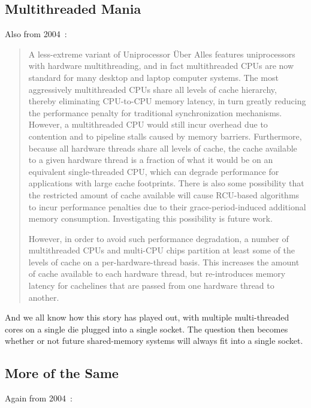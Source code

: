 \subsection{Multithreaded Mania}
\label{sec:future:Multithreaded Mania}

Also from 2004~\cite{PaulEdwardMcKenneyPhD}:

\begin{quote}
	A less-extreme variant of Uniprocessor \"Uber Alles features
	uniprocessors with hardware multithreading, and in fact
	multithreaded CPUs are now standard for many desktop and laptop
	computer systems.  The most aggressively multithreaded CPUs share
	all levels of cache hierarchy, thereby eliminating CPU-to-CPU
	memory latency, in turn greatly reducing the performance
	penalty for traditional synchronization mechanisms.  However,
	a multithreaded CPU would still incur overhead due to contention
	and to pipeline stalls caused by memory barriers.  Furthermore,
	because all hardware threads share all levels of cache, the
	cache available to a given hardware thread is a fraction of
	what it would be on an equivalent single-threaded CPU, which can
	degrade performance for applications with large cache footprints.
	There is also some possibility that the restricted amount of cache
	available will cause RCU-based algorithms to incur performance
	penalties due to their grace-period-induced additional memory
	consumption.  Investigating this possibility is future work.

	However, in order to avoid such performance degradation, a number
	of multithreaded CPUs and multi-CPU chips partition at least
	some of the levels of cache on a per-hardware-thread basis.
	This increases the amount of cache available to each hardware
	thread, but re-introduces memory latency for cachelines that
	are passed from one hardware thread to another.
\end{quote}

And we all know how this story has played out, with multiple multi-threaded
cores on a single die plugged into a single socket.
The question then becomes whether or not future shared-memory systems will
always fit into a single socket.

\subsection{More of the Same}
\label{sec:meas:More of the Same}

Again from 2004~\cite{PaulEdwardMcKenneyPhD}:

